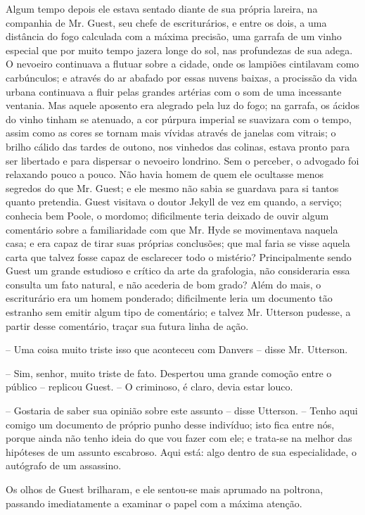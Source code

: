 Algum tempo depois ele estava sentado diante de sua própria lareira, na
companhia de Mr. Guest, seu chefe de escriturários, e entre os dois, a
uma distância do fogo calculada com a máxima precisão, uma garrafa de
um vinho especial que por muito tempo jazera longe do sol, nas
profundezas de sua adega.  O nevoeiro continuava a flutuar sobre a
cidade, onde os lampiões cintilavam como carbúnculos; e através do ar
abafado por essas nuvens baixas, a procissão da vida urbana continuava
a fluir pelas grandes artérias com o som de uma incessante ventania. 
Mas aquele aposento era alegrado pela luz do fogo; na garrafa, os
ácidos do vinho tinham se atenuado, a cor púrpura imperial se suavizara
com o tempo, assim como as cores se tornam mais vívidas através de
janelas com vitrais; o brilho cálido das tardes de outono, nos vinhedos
das colinas, estava pronto para ser libertado e para dispersar o
nevoeiro londrino.  Sem o perceber, o advogado foi relaxando pouco a
pouco.  Não havia homem de quem ele ocultasse menos segredos do que Mr.
Guest; e ele mesmo não sabia se guardava para si tantos quanto
pretendia.  Guest visitava o doutor Jekyll de vez em quando, a serviço;
conhecia bem Poole, o mordomo; dificilmente teria deixado de ouvir
algum comentário sobre a familiaridade com que Mr. Hyde se movimentava
naquela casa; e era capaz de tirar suas próprias conclusões; que mal
faria se visse aquela carta que talvez fosse capaz de esclarecer todo o
mistério? Principalmente sendo Guest um grande estudioso e crítico da
arte da grafologia, não consideraria essa consulta um fato natural, e
não acederia de bom grado?  Além do mais, o escriturário era um homem
ponderado; dificilmente leria um documento tão estranho sem emitir
algum tipo de comentário; e talvez Mr. Utterson pudesse, a partir desse
comentário, traçar sua futura linha de ação.

-- Uma coisa muito triste isso que aconteceu com Danvers -- disse Mr.
Utterson.

-- Sim, senhor, muito triste de fato.  Despertou uma grande comoção
entre o público -- replicou Guest. -- O criminoso, é claro, devia estar
louco.

-- Gostaria de saber sua opinião sobre este assunto -- disse Utterson. --
Tenho aqui comigo um documento de próprio punho desse indivíduo; isto
fica entre nós,  porque ainda não tenho ideia do que vou fazer com ele;
e trata-se na melhor das hipóteses de um assunto escabroso.  Aqui está:
algo dentro de sua especialidade, o autógrafo de um assassino.

Os olhos de Guest brilharam, e ele sentou-se mais aprumado na poltrona,
passando imediatamente a examinar o papel com a máxima atenção.

